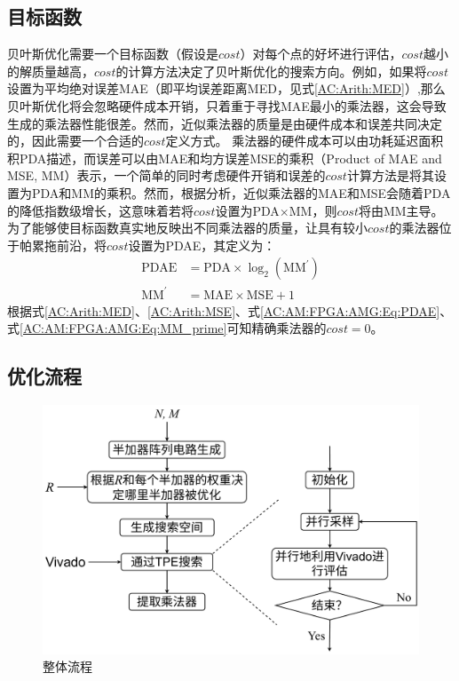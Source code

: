 \subsection{目标函数}

贝叶斯优化需要一个目标函数（假设是$cost$）对每个点的好坏进行评估，$cost$越小的解质量越高，$cost$的计算方法决定了贝叶斯优化的搜索方向。例如，如果将$cost$设置为平均绝对误差MAE（即平均误差距离MED，见式\eqref{AC:Arith:MED}）,那么贝叶斯优化将会忽略硬件成本开销，只着重于寻找MAE最小的乘法器，这会导致生成的乘法器性能很差。然而，近似乘法器的质量是由硬件成本和误差共同决定的，因此需要一个合适的$cost$定义方式。
乘法器的硬件成本可以由功耗延迟面积积PDA描述，而误差可以由MAE和均方误差MSE的乘积（Product of MAE and MSE, MM）表示，一个简单的同时考虑硬件开销和误差的$cost$计算方法是将其设置为PDA和MM的乘积。然而，根据分析，近似乘法器的MAE和MSE会随着PDA的降低指数级增长，这意味着若将$cost$设置为PDA$ \times $MM，则$cost$将由MM主导。为了能够使目标函数真实地反映出不同乘法器的质量，让具有较小$cost$的乘法器位于帕累拖前沿，将$cost$设置为PDAE，其定义为：
\begin{align}
    \text{PDAE} & = \text{PDA} \times \log_2 (\text{MM}^{\prime}) \label{AC:AM:FPGA:AMG:Eq:PDAE}  \\
    \text{MM}^{\prime} & = \text{MAE} \times \text{MSE} + 1 \label{AC:AM:FPGA:AMG:Eq:MM_prime}
\end{align}
根据式\eqref{AC:Arith:MED}、\eqref{AC:Arith:MSE}、式\eqref{AC:AM:FPGA:AMG:Eq:PDAE}、式\eqref{AC:AM:FPGA:AMG:Eq:MM_prime}可知精确乘法器的$cost=0$。


\subsection{优化流程}


\begin{figure}[!htbp]
    \centering
    \includegraphics[width=0.8\linewidth]{./figs/AC-AM-FPGA-AMG-flow.pdf}
    \caption{整体流程}
    \label{AC:AM:FPGA:AMG:Fig:flow}
\end{figure}

